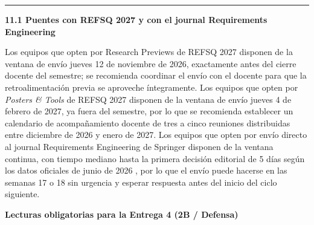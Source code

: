 \documentclass[11pt,a4paper]{article}
\newcounter{secc}
\newcommand{\secband}[1]{%
    \stepcounter{secc}\par\vspace{9pt}\noindent
    {\setlength{\fboxsep}{0pt}%
        \colorbox{uteqgold}{\parbox[c][20pt][c]{0.05\textwidth}{\centering\textbf{\color{white}\small \arabic{secc}}}}%
        \colorbox{uteqgreen}{\parbox[c][20pt][c]{0.95\textwidth}{\hspace{8pt}\textbf{\color{white}\small #1}}}%
    }\par\vspace{5pt}}
\newcommand{\submark}[1]{\par\vspace{4pt}\noindent
    {\color{uteqgreen}\rule[-1pt]{3.5pt}{12pt}}\hspace{6pt}\textbf{\color{uteqgreen}#1}\par\vspace{2pt}}
\begin{document}
\submark{11.1 Puentes con REFSQ 2027 y con el journal Requirements Engineering}
Los equipos que opten por Research Previews de REFSQ 2027 disponen de la ventana de envío jueves 12 de noviembre de 2026, exactamente antes del cierre docente del semestre; se recomienda coordinar el envío con el docente para que la retroalimentación previa se aproveche íntegramente.
Los equipos que opten por \emph{Posters \& Tools} de REFSQ 2027 disponen de la ventana de envío jueves 4 de febrero de 2027, ya fuera del semestre, por lo que se recomienda establecer un calendario de acompañamiento docente de tres a cinco reuniones distribuidas entre diciembre de 2026 y enero de 2027.
Los equipos que opten por envío directo al journal Requirements Engineering de Springer disponen de la ventana continua, con tiempo mediano hasta la primera decisión editorial de 5 días según los datos oficiales de junio de 2026 \cite{req_eng_journal_2025}, por lo que el envío puede hacerse en las semanas 17 o 18 sin urgencia y esperar respuesta antes del inicio del ciclo siguiente.

\secband{Lecturas obligatorias para la Entrega 4 (2B / Defensa)}
\end{document}
